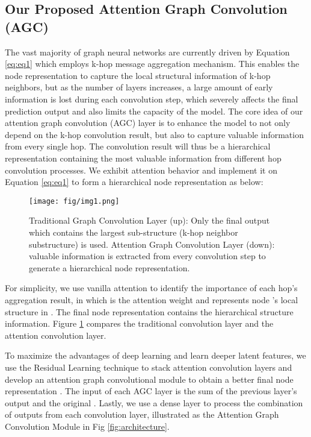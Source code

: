 \documentclass[conference]{IEEEtran}
\begin{document}
	    \subsection{Our Proposed Attention Graph Convolution (AGC)} The vast majority of graph neural networks are currently driven by Equation \ref{eq:eq1} which employs k-hop message aggregation mechanism. This enables the node representation to capture the local structural information of k-hop neighbors, but as the number of layers increases, a large amount of early information is lost during each convolution step, which severely affects the final prediction output and also limits the capacity of the model. The core idea of our attention graph convolution (AGC) layer is to enhance the model to not only depend on the k-hop convolution result, but also to capture valuable information from every single hop. The convolution result will thus be a hierarchical representation containing the most valuable information from different hop convolution processes. We exhibit attention behavior and implement it on Equation \ref{eq:eq1} to form a hierarchical node representation  as below:  

		
		
    	\begin{figure}
 	 	\centering
 	 		\texttt{[image: fig/img1.png]}
 	 		\caption{Traditional Graph Convolution Layer (up): Only the final output which contains the largest sub-structure (k-hop neighbor substructure) is used. Attention Graph Convolution Layer (down): valuable information is extracted from every convolution step to generate a hierarchical node representation.}   
 	 	\label{fig:traditional}
		\end{figure}
		
		For simplicity, we use vanilla attention to identify the importance of each hop's aggregation result, in which  is the attention weight and  represents node 's local structure in . The final node representation contains the hierarchical structure information. Figure \ref{fig:traditional} compares the traditional convolution layer and the attention convolution layer.
		
		To maximize the advantages of deep learning and learn deeper latent features, we use the Residual Learning technique \cite{he2016deep} to stack  attention convolution layers and develop an attention graph convolutional module to obtain a better final node representation .  The input of each AGC layer is the sum of the previous layer's output and the original . Lastly, we use a dense layer to process the combination of outputs from each convolution layer, illustrated as the Attention Graph Convolution Module in Fig \ref{fig:architecture}.
				
\end{document}
